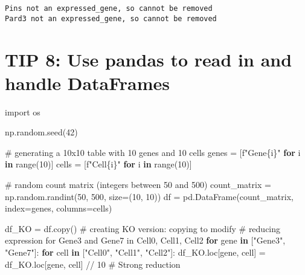 \documentclass[
  letterpaper,
  DIV=11,
  numbers=noendperiod]{scrartcl}
\newenvironment{Shaded}{\begin{snugshade}}{\end{snugshade}}
\newcommand{\BuiltInTok}[1]{\textcolor[rgb]{0.00,0.23,0.31}{#1}}
\newcommand{\CommentTok}[1]{\textcolor[rgb]{0.37,0.37,0.37}{#1}}
\newcommand{\ControlFlowTok}[1]{\textcolor[rgb]{0.00,0.23,0.31}{\textbf{#1}}}
\newcommand{\DecValTok}[1]{\textcolor[rgb]{0.68,0.00,0.00}{#1}}
\newcommand{\ImportTok}[1]{\textcolor[rgb]{0.00,0.46,0.62}{#1}}
\newcommand{\KeywordTok}[1]{\textcolor[rgb]{0.00,0.23,0.31}{\textbf{#1}}}
\newcommand{\NormalTok}[1]{\textcolor[rgb]{0.00,0.23,0.31}{#1}}
\newcommand{\OperatorTok}[1]{\textcolor[rgb]{0.37,0.37,0.37}{#1}}
\newcommand{\SpecialCharTok}[1]{\textcolor[rgb]{0.37,0.37,0.37}{#1}}
\newcommand{\SpecialStringTok}[1]{\textcolor[rgb]{0.13,0.47,0.30}{#1}}
\newcommand{\StringTok}[1]{\textcolor[rgb]{0.13,0.47,0.30}{#1}}
\begin{document}
\begin{verbatim}
Pins not an expressed_gene, so cannot be removed
Pard3 not an expressed_gene, so cannot be removed
\end{verbatim}

\section{TIP 8: Use pandas to read in and handle
DataFrames}\label{tip-8-use-pandas-to-read-in-and-handle-dataframes}

\begin{Shaded}
\begin{Highlighting}[]
\ImportTok{import}\NormalTok{ os}

\NormalTok{np.random.seed(}\DecValTok{42}\NormalTok{)}

\CommentTok{\# generating a 10x10 table with 10 genes and 10 cells}
\NormalTok{genes }\OperatorTok{=}\NormalTok{ [}\SpecialStringTok{f"Gene}\SpecialCharTok{\{}\NormalTok{i}\SpecialCharTok{\}}\SpecialStringTok{"} \ControlFlowTok{for}\NormalTok{ i }\KeywordTok{in} \BuiltInTok{range}\NormalTok{(}\DecValTok{10}\NormalTok{)]}
\NormalTok{cells }\OperatorTok{=}\NormalTok{ [}\SpecialStringTok{f"Cell}\SpecialCharTok{\{}\NormalTok{i}\SpecialCharTok{\}}\SpecialStringTok{"} \ControlFlowTok{for}\NormalTok{ i }\KeywordTok{in} \BuiltInTok{range}\NormalTok{(}\DecValTok{10}\NormalTok{)]}

\CommentTok{\# random count matrix (integers between 50 and 500)}
\NormalTok{count\_matrix }\OperatorTok{=}\NormalTok{ np.random.randint(}\DecValTok{50}\NormalTok{, }\DecValTok{500}\NormalTok{, size}\OperatorTok{=}\NormalTok{(}\DecValTok{10}\NormalTok{, }\DecValTok{10}\NormalTok{))}
\NormalTok{df }\OperatorTok{=}\NormalTok{ pd.DataFrame(count\_matrix, index}\OperatorTok{=}\NormalTok{genes, columns}\OperatorTok{=}\NormalTok{cells)}


\NormalTok{df\_KO }\OperatorTok{=}\NormalTok{ df.copy() }\CommentTok{\# creating KO version: copying to modify}
\CommentTok{\# reducing expression for Gene3 and Gene7 in Cell0, Cell1, Cell2}
\ControlFlowTok{for}\NormalTok{ gene }\KeywordTok{in}\NormalTok{ [}\StringTok{"Gene3"}\NormalTok{, }\StringTok{"Gene7"}\NormalTok{]:}
    \ControlFlowTok{for}\NormalTok{ cell }\KeywordTok{in}\NormalTok{ [}\StringTok{"Cell0"}\NormalTok{, }\StringTok{"Cell1"}\NormalTok{, }\StringTok{"Cell2"}\NormalTok{]:}
\NormalTok{        df\_KO.loc[gene, cell] }\OperatorTok{=}\NormalTok{ df\_KO.loc[gene, cell] }\OperatorTok{//} \DecValTok{10}  \CommentTok{\# Strong reduction}



\end{Highlighting}
\end{Shaded}
\end{document}
